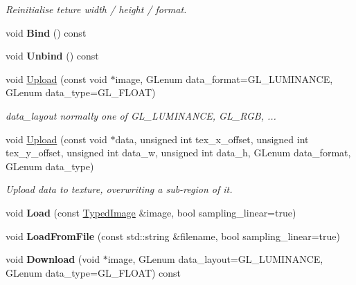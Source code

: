 \begin{DoxyCompactItemize}
\begin{DoxyCompactList}\small\item\em Reinitialise teture width / height / format. \end{DoxyCompactList}\item 
void {\bfseries Bind} () const \hypertarget{classpangolin_1_1_gl_texture_a7b6da38e7ca3222d08c0cac2ca98a218}{}\label{classpangolin_1_1_gl_texture_a7b6da38e7ca3222d08c0cac2ca98a218}

\item 
void {\bfseries Unbind} () const \hypertarget{classpangolin_1_1_gl_texture_ab37bc2e23047a1f6f9a571ad5fbfb476}{}\label{classpangolin_1_1_gl_texture_ab37bc2e23047a1f6f9a571ad5fbfb476}

\item 
void \hyperlink{classpangolin_1_1_gl_texture_a5d01b592367029975714da0062b8f6f9}{Upload} (const void $\ast$image, G\+Lenum data\+\_\+format=G\+L\+\_\+\+L\+U\+M\+I\+N\+A\+N\+CE, G\+Lenum data\+\_\+type=G\+L\+\_\+\+F\+L\+O\+AT)
\begin{DoxyCompactList}\small\item\em data\+\_\+layout normally one of G\+L\+\_\+\+L\+U\+M\+I\+N\+A\+N\+CE, G\+L\+\_\+\+R\+GB, ... \end{DoxyCompactList}\item 
void \hyperlink{classpangolin_1_1_gl_texture_ad78ac40f91fb27d65705608c35c972c0}{Upload} (const void $\ast$data, unsigned int tex\+\_\+x\+\_\+offset, unsigned int tex\+\_\+y\+\_\+offset, unsigned int data\+\_\+w, unsigned int data\+\_\+h, G\+Lenum data\+\_\+format, G\+Lenum data\+\_\+type)
\begin{DoxyCompactList}\small\item\em Upload data to texture, overwriting a sub-\/region of it. \end{DoxyCompactList}\item 
void {\bfseries Load} (const \hyperlink{structpangolin_1_1_typed_image}{Typed\+Image} \&image, bool sampling\+\_\+linear=true)\hypertarget{classpangolin_1_1_gl_texture_a0407f01869fd270aab991116162d936b}{}\label{classpangolin_1_1_gl_texture_a0407f01869fd270aab991116162d936b}

\item 
void {\bfseries Load\+From\+File} (const std\+::string \&filename, bool sampling\+\_\+linear=true)\hypertarget{classpangolin_1_1_gl_texture_ab7601520d0133e540c192f1d1fa2fd93}{}\label{classpangolin_1_1_gl_texture_ab7601520d0133e540c192f1d1fa2fd93}

\item 
void {\bfseries Download} (void $\ast$image, G\+Lenum data\+\_\+layout=G\+L\+\_\+\+L\+U\+M\+I\+N\+A\+N\+CE, G\+Lenum data\+\_\+type=G\+L\+\_\+\+F\+L\+O\+AT) const \hypertarget{classpangolin_1_1_gl_texture_a062809c9c598692fafd039a5f64e9622}{}\label{classpangolin_1_1_gl_texture_a062809c9c598692fafd039a5f64e9622}


\end{DoxyCompactItemize}
